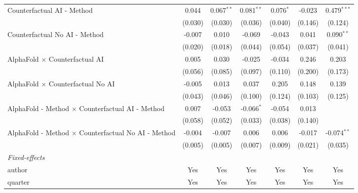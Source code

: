 \begin{tabular}{lcccccc}
   Counterfactual AI - Method                                 & 0.044   & 0.067$^{**}$ & 0.081$^{**}$ & 0.076$^{*}$ & -0.023  & 0.479$^{***}$\\   
                                                              & (0.030) & (0.030)      & (0.036)      & (0.040)     & (0.146) & (0.124)\\   
   Counterfactual No AI - Method                              & -0.007  & 0.010        & -0.069       & -0.043      & 0.041   & 0.090$^{**}$\\   
                                                              & (0.020) & (0.018)      & (0.044)      & (0.054)     & (0.037) & (0.041)\\   
   AlphaFold $\times$ Counterfactual AI                       & 0.005   & 0.030        & -0.025       & -0.034      & 0.246   & 0.203\\   
                                                              & (0.056) & (0.085)      & (0.097)      & (0.110)     & (0.200) & (0.173)\\   
   AlphaFold $\times$ Counterfactual No AI                    & -0.005  & 0.013        & 0.037        & 0.205       & 0.148   & 0.139\\   
                                                              & (0.043) & (0.046)      & (0.100)      & (0.124)     & (0.103) & (0.125)\\   
   AlphaFold - Method $\times$ Counterfactual AI - Method     & 0.007   & -0.053       & -0.066$^{*}$ & -0.054      & 0.013   &   \\   
                                                              & (0.058) & (0.052)      & (0.033)      & (0.038)     & (0.140) &   \\   
   AlphaFold - Method $\times$ Counterfactual No AI - Method  & -0.004  & -0.007       & 0.006        & 0.006       & -0.017  & -0.074$^{**}$\\   
                                                              & (0.005) & (0.005)      & (0.007)      & (0.009)     & (0.021) & (0.035)\\   
   \midrule
   \emph{Fixed-effects}\\
   author                                                     & Yes     & Yes          & Yes          & Yes         & Yes     & Yes\\  
   quarter                                                    & Yes     & Yes          & Yes          & Yes         & Yes     & Yes\\  

\end{tabular}
